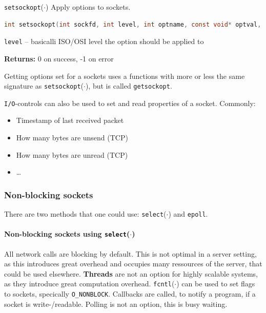 \documentclass[english]{panikzettel}
\newcommand{\fkt}[1]{\texttt{#1}(\(\cdot\))}
\begin{document}
	\begin{defi}{\fkt{setsockopt}}
		Apply options to sockets.
		\begin{lstlisting}[language=C]
			int setsockopt(int sockfd, int level, int optname, const void* optval, socklen_t optlen);
		\end{lstlisting}
		\tcblower
		\texttt{level} – basicalli ISO/OSI level the option should be applied to
		
		\textbf{Returns:} 0 on success, -1 on error
	\end{defi}
	
	Getting options set for a sockets uses a functions with more or less the same signature as \fkt{setsockopt}, but is called \texttt{getsockopt}.

	\texttt{I/O}-controls can also be used to set and read properties of a socket. Commonly:
	\begin{itemize}
		\item Timestamp of last received packet
		\item How many bytes are unsend (TCP)
		\item How many bytes are unread (TCP)
		\item \dots
	\end{itemize}
	
	\subsubsection{Non-blocking sockets}
	
	There are two methods that one could use: \fkt{select} and \texttt{epoll}.

	\paragraph{Non-blocking sockets using \fkt{select}}
	All network calls are blocking by default. 
	This is not optimal in a server setting, as this introduces great overhead and occupies many ressources of the server, that could be used elsewhere. 
	\textbf{Threads} are not an option for highly scalable systems, as they introduce great computation overhead.
	\fkt{fcntl} can be used to set flags to sockets, specically \texttt{O\_NONBLOCK}.
	Callbacks are called, to notify a program, if a socket is write-/readable.
	Polling is not an option, this is busy waiting.	
\end{document}
